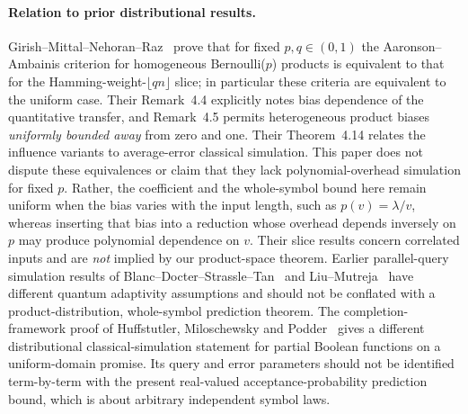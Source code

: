 \documentclass[11pt]{article}
\numberwithin{equation}{section}
\theoremstyle{remark}
\begin{document}
\paragraph{Relation to prior distributional results.}
Girish--Mittal--Nehoran--Raz~\cite[Theorem~4.3]{GMNR26} prove that for fixed $p,q\in(0,1)$ the Aaronson--Ambainis criterion for homogeneous Bernoulli($p$) products is equivalent to that for the Hamming-weight-$\lfloor qn\rfloor$ slice; in particular these criteria are equivalent to the uniform case. Their Remark~4.4 explicitly notes bias dependence of the quantitative transfer, and Remark~4.5 permits heterogeneous product biases \emph{uniformly bounded away} from zero and one. Their Theorem~4.14 relates the influence variants to average-error classical simulation. This paper does not dispute these equivalences or claim that they lack polynomial-overhead simulation for fixed $p$. Rather, the coefficient and the whole-symbol bound here remain uniform when the bias varies with the input length, such as $p(v)=\lambda/v$, whereas inserting that bias into a reduction whose overhead depends inversely on $p$ may produce polynomial dependence on $v$. Their slice results concern correlated inputs and are \emph{not} implied by our product-space theorem. Earlier parallel-query simulation results of Blanc--Docter--Strassle--Tan~\cite{BDSTparallel26} and Liu--Mutreja~\cite{LM26} have different quantum adaptivity assumptions and should not be conflated with a product-distribution, whole-symbol prediction theorem. The completion-framework proof of Huffstutler,
Miloschewsky and Podder~\cite{HMP26} gives a different distributional
classical-simulation statement for partial Boolean functions on a
uniform-domain promise. Its query and error parameters should not be
identified term-by-term with the present real-valued acceptance-probability
prediction bound, which is about arbitrary independent symbol laws.
\end{document}
